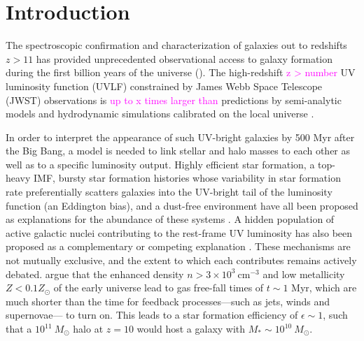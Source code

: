 \documentclass[twocolumn,linenumbers]{aastex631}
\begin{document}
\section{Introduction}
The spectroscopic confirmation and characterization of galaxies out to redshifts $z > 11$ has provided unprecedented observational access to galaxy formation during the first billion years of the universe (\citealt{2023Natur.622..707A, 2023A&A...677A..88B, 2023NatAs...7..622C, 2024Natur.633..318C, 2024ApJ...972..143C, 2026arXiv260111515D}). The high-redshift \textcolor{magenta}{z > number} UV luminosity function (UVLF) constrained by James Webb Space Telescope (JWST) observations is \textcolor{magenta}{ up to x times larger than } predictions by semi-analytic models and hydrodynamic simulations calibrated on the local universe \citep{2025arXiv251012411M, 2026arXiv260202322M,2025arXiv250804791F,2024MNRAS.531..997C, 2026MNRAS.546f2267C, 2025ApJ...995...43A, 2025A&A...698A.234D,2024ApJ...960...56H, 2025arXiv250804791F,2020ApJ...891..146R,2024A&A...691A..87M,2026arXiv260121833H}.

In order to interpret the appearance of such UV-bright galaxies by 500 Myr after the Big Bang, a model is needed to link stellar and halo masses to each other as well as to a specific luminosity output. Highly efficient star formation, a top-heavy IMF, bursty star formation histories whose variability in star formation rate preferentially scatters galaxies into the UV-bright tail of the luminosity function (an Eddington bias), and a dust-free environment have all been proposed as explanations for the abundance of these systems \citep{2022ApJ...938L..10I,2023MNRAS.522.3986F,2023MNRAS.523.3201D,2023ApJ...955L..35S,2024A&A...684A.207F,2023MNRAS.520.2445Z,Somerville2025SFE}. A hidden population of active galactic nuclei contributing to the rest-frame UV luminosity has also been proposed as a complementary or competing explanation \citep{2024JCAP...08..025H}. These mechanisms are not mutually exclusive, and the extent to which each contributes remains actively debated. \cite{2023MNRAS.523.3201D} argue that the enhanced density $n>3\times10^3\ \mathrm{cm^{-3}}$ and low metallicity $Z<0.1 Z_\odot$ of the early universe lead to gas free-fall times of $t \sim 1$ Myr, which are much shorter than the time for feedback processes---such as jets, winds and supernovae--- to turn on. This leads to a star formation efficiency of $\epsilon \sim 1$, such that a $10^{11}\ M_\odot$ halo at $z=10$ would host a galaxy with $M_*\sim 10^{10}\ M_\odot$.
\end{document}
